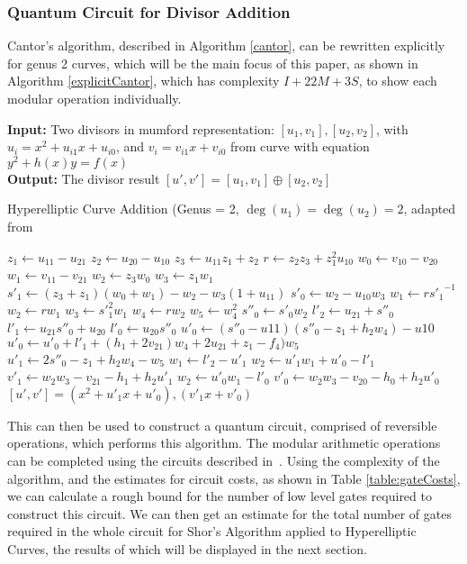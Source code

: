\subsubsection{Quantum Circuit for Divisor Addition}
Cantor's algorithm, described in Algorithm \ref{cantor}, can be rewritten explicitly for genus 2 curves, which will be the main focus of this paper, as shown in Algorithm \ref{explicitCantor}, which has complexity $I + 22M + 3S$, to show each modular operation individually.
\begin{algorithm}[!htb]
\textbf{Input:} Two divisors in mumford representation: $[u_1, v_1], [u_2, v_2]$, with $u_i = x^2 +u_{i1}x + u_{i0}$, and $v_i = v_{i1}x + v_{i0}$ from curve with equation $y^2 + h(x)y = f(x)$\\
\textbf{Output:} The divisor result $[u',v'] = [u_1,v_1] \oplus [u_2,v_2]$ 
\caption{Hyperelliptic Curve Addition (Genus = 2, $\deg(u_1) = \deg(u_2) = 2$, adapted from~\cite{cohen2005handbook}}\label{explicitCantor}
\algrule
\begin{algorithmic}[1]
\State $z_1 \longleftarrow u_{11} - u_{21}$
\State $z_2 \longleftarrow u_{20} - u_{10}$
\State $z_3 \longleftarrow u_{11}z_1 + z_2$
\State $r \longleftarrow z_2z_3 + z_1^2u_{10}$
\State $w_0 \longleftarrow v_{10} - v_{20}$
\State $w_1 \longleftarrow v_{11} - v_{21}$
\State $w_2 \longleftarrow z_3w_0$
\State $w_3 \longleftarrow z_1w_1$
\State $s'_1 \longleftarrow (z_3 + z_1)(w_0+w_1)-w_2-w_3(1+u_{11})$
\State $s'_0 \longleftarrow w_2-u_{10}w_3$
\State $w_1 \longleftarrow {rs'_1}^{-1}$
\State $w_2 \longleftarrow rw_1$
\State $w_3 \longleftarrow {s'}_1^2w_1$
\State $w_4 \longleftarrow rw_2$
\State $w_5 \longleftarrow w_4^2$
\State $s''_0 \longleftarrow s'_0w_2$
\State $l'_2 \longleftarrow u_{21} + s''_0$
\State $l'_1 \longleftarrow u_{21}s''_0 + u_{20}$
\State $l'_0 \longleftarrow u_{20}s''_0$
\State $u'_0 \longleftarrow (s''_0-u{11})(s''_0 - z_1 + h_2w_4) - u{10}$
\State $u'_0 \longleftarrow u'_0+l'_1 + (h_1 + 2v_{21})w_4 + 2u_{21} + z_1 - f_4)w_5$
\State $u'_1 \longleftarrow 2s''_0 - z_1 + h_2w_4 - w_5$
\State $w_1 \longleftarrow l'_2 - u'_1$
\State $w_2 \longleftarrow u'_1w_1 + u'_0 - l'_1$
\State $v'_1 \longleftarrow w_2w_3 - v_{21} - h_1 + h_2u'_1$
\State $w_2 \longleftarrow u'_0w_1 - l'_0$
\State $v'_0 \longleftarrow w_2w_3 - v_{20} - h_0 +h_2u'_0$
\Return $[u', v'] = (x^2 + u'_1x + u'_0), (v'_1x + v'_0)$
\end{algorithmic}
\end{algorithm} This can then be used to construct a quantum circuit, comprised of reversible operations, which performs this algorithm. The modular arithmetic operations can be completed using the circuits described in~\cite{roetteler2017quantum}. Using the complexity of the algorithm, and the estimates for circuit costs, as shown in Table \ref{table:gateCosts}, we can calculate a rough bound for the number of low level gates required to construct this circuit. We can then get an estimate for the total number of gates required in the whole circuit for Shor's Algorithm applied to Hyperelliptic Curves, the results of which will be displayed in the next section.
